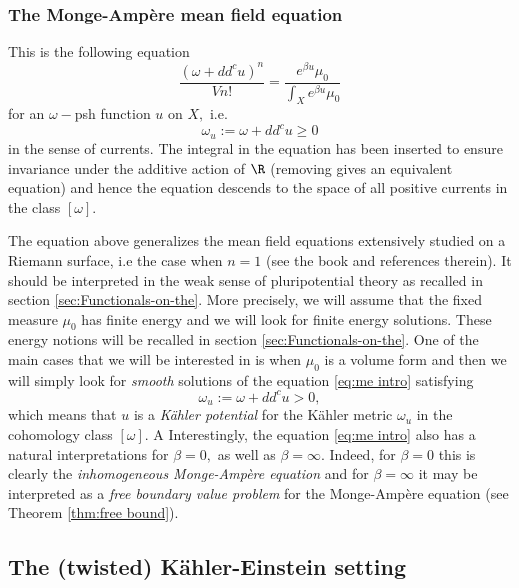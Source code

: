 \documentclass[11pt,oneside,english]{amsart}
\numberwithin{equation}{section}
\numberwithin{figure}{section}
\theoremstyle{plain}
\theoremstyle{plain}
\theoremstyle{plain}
\theoremstyle{plain}
\theoremstyle{remark}
\theoremstyle{definition}
\begin{document}
\subsubsection*{The Monge-Ampère mean field equation }

This is the following equation 
\begin{equation}
\frac{(\omega+dd^{c}u)^{n}}{Vn!}=\frac{e^{\beta u}\mu_{0}}{\int_{X}e^{\beta u}\mu_{0}}\label{eq:me intro}
\end{equation}
 for an $\omega-$psh function $u$ on $X,$ i.e. 
\begin{equation}
\omega_{u}:=\omega+dd^{c}u\geq0\label{eq:omega u pos intro}
\end{equation}
 in the sense of currents. The integral in the equation has been inserted
to ensure invariance under the additive action of $\R$ (removing
gives an equivalent equation) and hence the equation descends to the
space of all positive currents in the class $[\omega].$

The equation above generalizes the mean field equations extensively
studied on a Riemann surface, i.e the case when $n=1$ (see the book
\cite{ta} and references therein). It should be interpreted in the
weak sense of pluripotential theory as recalled in section \ref{sec:Functionals-on-the}.
More precisely, we will assume that the fixed measure $\mu_{0}$ has
finite energy and we will look for finite energy solutions. These
energy notions will be recalled in section \ref{sec:Functionals-on-the}.
One of the main cases that we will be interested in is when $\mu_{0}$
is a volume form and then we will simply look for\emph{ smooth} solutions
of the equation \ref{eq:me intro} satisfying 
\[
\omega_{u}:=\omega+dd^{c}u>0,
\]
 which means that $u$ is a \emph{Kähler potential} for the Kähler
metric $\omega_{u}$ in the cohomology class $[\omega].$ A Interestingly,
the equation \ref{eq:me intro} also has a natural interpretations
for $\beta=0,$ as well as $\beta=\infty.$ Indeed, for $\beta=0$
this is clearly the \emph{inhomogeneous Monge-Ampère equation }and
for $\beta=\infty$ it may be interpreted as a \emph{free boundary
value problem} for the Monge-Ampère equation (see Theorem \ref{thm:free bound}).

\subsection{The (twisted) Kähler-Einstein setting }
\end{document}
